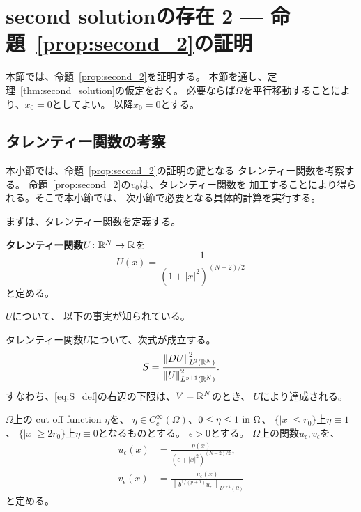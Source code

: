 \section{second solutionの存在 2 --- 命題~\ref{prop:second_2}の証明}

本節では、命題~\ref{prop:second_2}を証明する。
本節を通し、定理~\ref{thm:second_solution}の仮定をおく。
必要ならば$\Omega$を平行移動することにより、$x_0 = 0$としてよい。
以降$x_0 = 0$とする。

\subsection{タレンティー関数の考察}

本小節では、命題~\ref{prop:second_2}の証明の鍵となる
タレンティー関数を考察する。
命題~\ref{prop:second_2}の$v_0$は、タレンティー関数を
加工することにより得られる。そこで本小節では、
次小節で必要となる具体的計算を実行する。

まずは、タレンティー関数を定義する。
\begin{defn}
 {\bf タレンティー関数}$U \colon \mathbb{R}^N \to \mathbb{R}$を
 \[
   U(x) = \frac{1}{(1 + \lvert x \rvert^2)^{(N-2)/2}}
 \]
 と定める。
\end{defn}

$U$について、
以下の事実が知られている。

\begin{lem}[\cite{MR0463908}]
 タレンティー関数$U$について、次式が成立する。
 \begin{equation}
  S = \frac{\left\| DU \right\|_{L^2(\mathbb{R}^N)}^2}
   {\left\| U \right\|_{L^{p+1}(\mathbb{R}^N)}^2}. 
   \label{eq:S_ach}
 \end{equation}
 すなわち、\eqref{eq:S_def}の右辺の下限は、$V = \mathbb{R}^N$のとき、
 $U$により達成される。
\end{lem}

\begin{nota}
$\Omega$上の cut off function $\eta$を、
$\eta \in C^\infty_c (\Omega)$、$0 \leq \eta \leq 1 ~\text{in}~
\Omega$、
$\{ \lvert x \rvert \leq r_0 \}$上$\eta \equiv 1$、
$\{ \lvert x \rvert \geq 2r_0 \}$上$\eta \equiv 0$となるものとする。
$\epsilon > 0$とする。
$\Omega$上の関数$u_\epsilon, v_\epsilon$を、
\begin{align}
 u_\epsilon (x) &= \frac{\eta(x)}{(\epsilon + \lvert x
 \rvert^2)^{(N-2)/2}}, \label{eq:def_uepsilon} \\
 v_\epsilon (x) &= \frac{u_\epsilon(x)}{\left\| b^{1/(p+1)} u_\epsilon \right\|_{L^{p+1}(\Omega)}} \label{eq:def_vepsilon}
\end{align}
と定める。
\end{nota}

